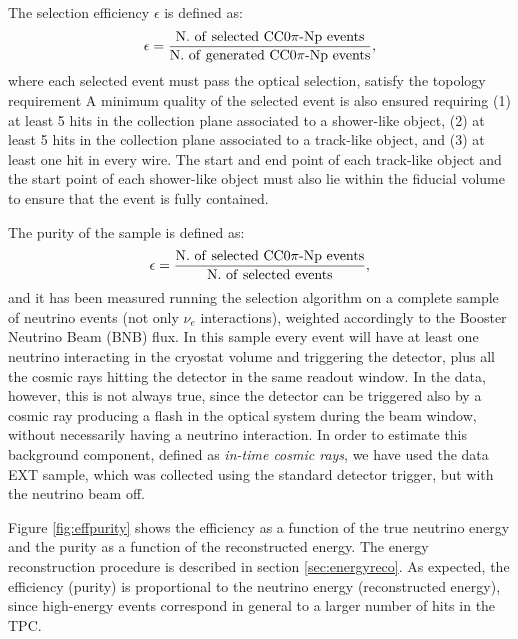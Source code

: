 The selection efficiency $\epsilon$ is defined as:
\begin{equation}
\epsilon = \frac{\mathrm{N.~of~selected~CC0}\pi\mathrm{{\text -}Np~events}}{\mathrm{N.~of~generated~CC0}\pi\mathrm{{\text -}Np~events}},
\end{equation}
where each selected event must pass the optical selection, satisfy the topology requirement A minimum quality of the selected event is also ensured requiring (1) at least 5 hits in the collection plane associated to a shower-like object, (2) at least 5 hits in the collection plane associated to a track-like object, and (3) at least one hit in every wire.
The start and end point of each track-like object and the start point of each shower-like object must also lie within the fiducial volume to ensure that the event is fully contained.

The purity of the sample is defined as:
\begin{equation}
\epsilon = \frac{\mathrm{N.~of~selected~CC0}\pi\mathrm{{\text -}Np~events}}{\mathrm{N.~of~selected~events}},
\end{equation}
and it has been measured running the selection algorithm on a complete sample of neutrino events (not only $\nu_{e}$ interactions), weighted accordingly to the Booster Neutrino Beam (BNB) flux. In this sample every event will have at least one neutrino interacting in the cryostat volume and triggering the detector, plus all the cosmic rays hitting the detector in the same readout window. In the data, however, this is not always true, since the detector can be triggered also by a cosmic ray producing a flash in the optical system during the beam window, without necessarily having a neutrino interaction. In order to estimate this background component, defined as \emph{in-time cosmic rays}, we have used the data EXT sample, which was collected using the standard detector trigger, but with the neutrino beam off.

Figure \ref{fig:effpurity} shows the efficiency as a function of the true neutrino energy and the purity as a function of the reconstructed energy. The energy reconstruction procedure is described in section \ref{sec:energyreco}.
As expected, the efficiency (purity) is proportional to the neutrino energy (reconstructed energy), since high-energy events correspond in general to a larger number of hits in the TPC. 


